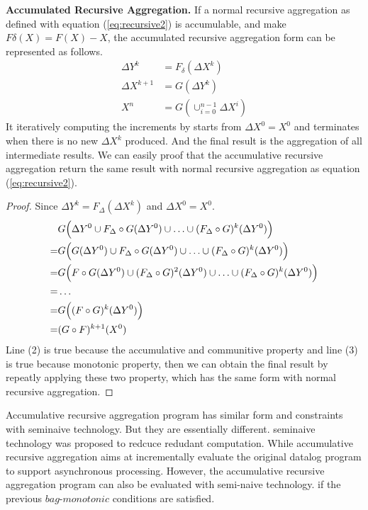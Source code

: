 {	\textbf{Accumulated Recursive Aggregation.} If a normal recursive aggregation  as defined with equation (\ref{eq:recursive2}) is accumulable, and make $F\delta(X)=F(X)-X$,  the accumulated recursive aggregation form can be represented as follows.
	\begin{equation}\label{eq:accumasync}
	\begin{aligned}
	\Delta Y^{k}&= F_{\delta}(\Delta X^k)\\
	\Delta X^{k+1}&= G(\Delta Y^{k})\\
	X^{n}&=G(\cup_{i=0}^{n-1} \Delta X^{i})
	\end{aligned}
	\end{equation}
	It iteratively computing the increments by starts from $\Delta X^0=X^0$ and terminates when there is no new $\Delta X^k$ produced. And the final result is the aggregation of all intermediate results. We can easily proof that the accumulative recursive aggregation return the same result with normal recursive aggregation as equation (\ref{eq:recursive2}).
	\begin{proof}
	\label{sec:app:proof:monotonic}
	Since $\Delta Y^k=F_\Delta(\Delta X^k)$ and $\Delta X^0=X^0$.
	\small
	\begin{align}
	&G\Big(\Delta Y^0\cup F_\Delta \circ G(\Delta Y^0)\cup\ldots\cup (F_\Delta\circ G)^k(\Delta Y^0)\Big)\notag \\
	=&G\Big(G(\Delta Y^0)\cup F_\Delta\circ G(\Delta Y^0)\cup \ldots \cup (F_\Delta\circ G)^k( \Delta Y^0)\Big)\notag\\
	=&G\Big(F\circ G(\Delta Y^0)\cup (F_\Delta\circ G)^2(\Delta Y^0)\cup \ldots \cup (F_\Delta\circ G)^k(\Delta Y^0)\Big) \notag\\
	=& \ldots \notag \\
	=&G\Big((F\circ G)^k(\Delta Y^0)\Big)\notag\\
	=&(G \circ F)^{k+1}(X^0)\notag
	\end{align}
	\normalsize
	Line (2) is true because the accumulative and communitive property and line (3) is true because monotonic property, then we can obtain the final result by repeatly applying these two property, which has the same form with normal recursive aggregation.
\end{proof} 

{\color{red}
Accumulative recursive aggregation program has similar form and constraints with seminaive technology. But they are essentially different.
seminaive technology was proposed to redcuce redudant computation. While accumulative recursive aggregation aims at incrementally evaluate the original datalog program to support asynchronous processing. However, the accumulative recursive aggregation program can also be evaluated with semi-naive technology. if the previous $bag$-$monotonic$ conditions are satisfied.}

}
